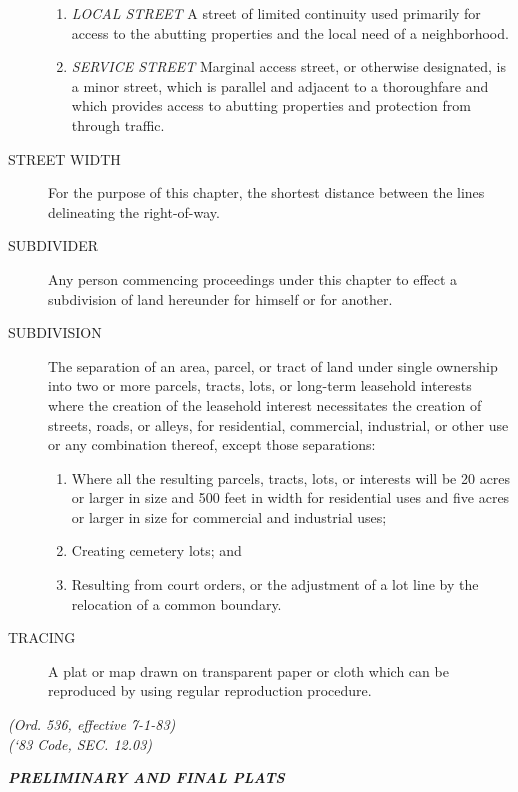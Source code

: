\begin{description}
\begin{enumerate}
            \item \emph{LOCAL STREET} A street of limited continuity used primarily for access to the abutting properties and the local need of a neighborhood.
            \item \emph{SERVICE STREET} Marginal access street, or otherwise designated, is a minor street, which is parallel and adjacent to a thoroughfare and which provides access to abutting properties and protection from through traffic.
        \end{enumerate}
    \item[STREET WIDTH] For the purpose of this chapter, the shortest distance between the lines delineating the right-of-way.
    \item[SUBDIVIDER] Any person commencing proceedings under this chapter to effect a subdivision of land hereunder for himself or for another.
    \item[SUBDIVISION] The separation of an area, parcel, or tract of land under single ownership into two or more parcels, tracts, lots, or long-term leasehold interests where the creation of the leasehold interest necessitates the creation of streets, roads, or alleys, for residential, commercial, industrial, or other use or any combination thereof, except those separations:
        \begin{enumerate}
            \item Where all the resulting parcels, tracts, lots, or interests will be 20 acres or larger in size and 500 feet in width for residential uses and five acres or larger in size for commercial and industrial uses;
            \item Creating cemetery lots; and
            \item Resulting from court orders, or the adjustment of a lot line by the relocation of a common boundary.
        \end{enumerate}
    \item[TRACING] A plat or map drawn on transparent paper or cloth which can be reproduced by using regular reproduction procedure.
\end{description}
\emph{(Ord. 536, effective 7-1-83)}\\
\emph{(‘83 Code, SEC. 12.03)}

\begin{center}
    \emph{\textbf{\LARGE{PRELIMINARY AND FINAL PLATS}}}
\end{center}

\setcounter{section}{14}
